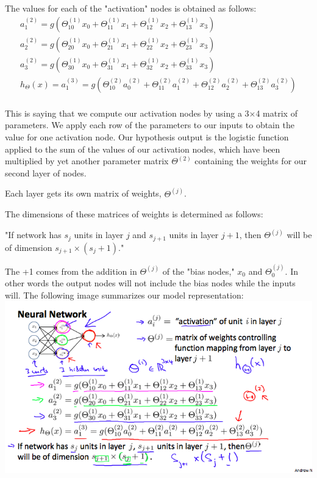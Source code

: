 \documentclass{article}
\begin{document}
The values for each of the "activation" nodes is obtained as follows:
\begin{align*} 
	a_1^{(2)} = g(\Theta_{10}^{(1)}x_0 + \Theta_{11}^{(1)}x_1 + \Theta_{12}^{(1)}x_2 + \Theta_{13}^{(1)}x_3) \\ 
	a_2^{(2)} = g(\Theta_{20}^{(1)}x_0 + \Theta_{21}^{(1)}x_1 + \Theta_{22}^{(1)}x_2 + \Theta_{23}^{(1)}x_3) \\ 
	a_3^{(2)} = g(\Theta_{30}^{(1)}x_0 + \Theta_{31}^{(1)}x_1 + \Theta_{32}^{(1)}x_2 + \Theta_{33}^{(1)}x_3) \\ 
	h_\Theta(x) = a_1^{(3)} = g(\Theta_{10}^{(2)}a_0^{(2)} + \Theta_{11}^{(2)}a_1^{(2)} + \Theta_{12}^{(2)}a_2^{(2)} + \Theta_{13}^{(2)}a_3^{(2)}) \\ 
\end{align*}

This is saying that we compute our activation nodes by using a 3×4 matrix of parameters. We apply each row of the parameters to our inputs to obtain the value for one activation node. Our hypothesis output is the logistic function applied to the sum of the values of our activation nodes, which have been multiplied by yet another parameter matrix $\Theta^{(2)}$ containing the weights for our second layer of nodes.

Each layer gets its own matrix of weights, $\Theta^{(j)}$.

The dimensions of these matrices of weights is determined as follows:

"If network has $s_j$ units in layer $j$ and $s_{j+1}$ units in layer $j+1$, then $\Theta^{(j)}$ will be of dimension $s_{j+1} \times (s_j + 1)$."

The +1 comes from the addition in $\Theta^{(j)}$ of the "bias nodes," $x_0$ and $\Theta_0^{(j)}$. In other words the output nodes will not include the bias nodes while the inputs will. The following image summarizes our model representation:\\
\includegraphics[width=\textwidth]{model_representation.png}
 
\end{document}
